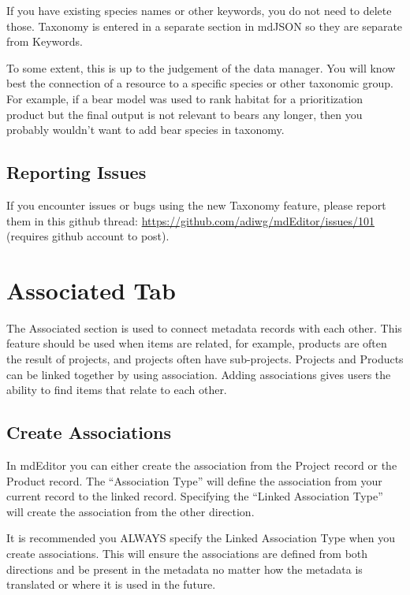 \documentclass[
]{book}
\makeatletter
\newenvironment{kframe}{%
\medskip{}
\setlength{\fboxsep}{.8em}
 \def\at@end@of@kframe{}%
 \ifinner\ifhmode%
  \def\at@end@of@kframe{\end{minipage}}%
  \begin{minipage}{\columnwidth}%
 \fi\fi%
 \def\FrameCommand##1{\hskip\@totalleftmargin \hskip-\fboxsep
 \colorbox{shadecolor}{##1}\hskip-\fboxsep
     \hskip-\linewidth \hskip-\@totalleftmargin \hskip\columnwidth}%
 \MakeFramed {\advance\hsize-\width
   \@totalleftmargin\z@ \linewidth\hsize
   \@setminipage}}%
 {\par\unskip\endMakeFramed%
 \at@end@of@kframe}
\newenvironment{rmdblock}[1]
  {
  \begin{itemize}
  \renewcommand{\labelitemi}{
    \raisebox{-.7\height}[0pt][0pt]{
      {\setkeys{Gin}{width=3em,keepaspectratio}\texttt{[image: images/\#1]}}
    }
  }
  \setlength{\fboxsep}{1em}
  \begin{kframe}
  \item
  }
  {
  \end{kframe}
  \end{itemize}
  }
\newenvironment{rmdwarning}
  {\begin{rmdblock}{warning}}
  {\end{rmdblock}}
\makeatother
\begin{document}
If you have existing species names or other keywords, you do not need to delete those. Taxonomy is entered in a separate section in mdJSON so they are separate from Keywords.

To some extent, this is up to the judgement of the data manager. You will know best the connection of a resource to a specific species or other taxonomic group. For example, if a bear model was used to rank habitat for a prioritization product but the final output is not relevant to bears any longer, then you probably wouldn't want to add bear species in taxonomy.

\hypertarget{reporting-issues}{%
\subsection{Reporting Issues}\label{reporting-issues}}

If you encounter issues or bugs using the new Taxonomy feature, please report them in this github thread: \url{https://github.com/adiwg/mdEditor/issues/101} (requires github account to post).

\hypertarget{project-associations}{%
\section{Associated Tab}\label{project-associations}}

The Associated section is used to connect metadata records with each other. This feature should be used when items are related, for example, products are often the result of projects, and projects often have sub-projects. Projects and Products can be linked together by using association. Adding associations gives users the ability to find items that relate to each other.

\hypertarget{create-associations}{%
\subsection{Create Associations}\label{create-associations}}

In mdEditor you can either create the association from the Project record or the Product record. The ``Association Type'' will define the association from your current record to the linked record. Specifying the ``Linked Association Type'' will create the association from the other direction.

\begin{rmdwarning}
It is recommended you ALWAYS specify the Linked Association Type when
you create associations. This will ensure the associations are defined
from both directions and be present in the metadata no matter how the
metadata is translated or where it is used in the future.
\end{rmdwarning}
\end{document}
